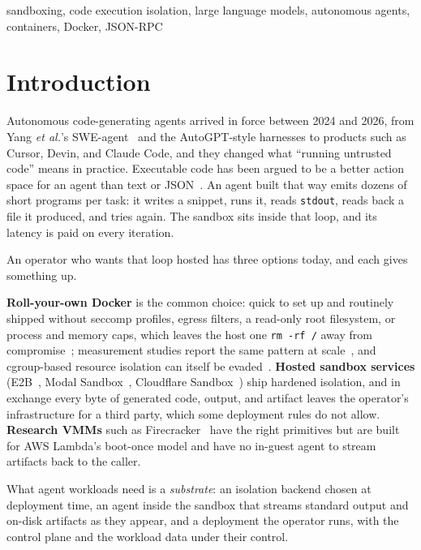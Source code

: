 \documentclass[conference]{IEEEtran}
\begin{document}
\begin{IEEEkeywords}
sandboxing, code execution isolation, large language models, autonomous
agents, containers, Docker, JSON-RPC
\end{IEEEkeywords}

\section{Introduction}\label{sec:intro}

Autonomous code-generating agents arrived in force between 2024 and 2026,
from Yang \emph{et al.}'s SWE-agent~\cite{sweagent} and the AutoGPT-style
harnesses to products such as Cursor, Devin, and Claude Code, and they
changed what ``running untrusted code'' means in practice. Executable code
has been argued to be a better action space for an agent than text or
JSON~\cite{codeact}. An agent built that way emits dozens of short programs
per task: it writes a snippet, runs it, reads \texttt{stdout}, reads back a
file it produced, and tries again. The sandbox sits inside that loop, and its
latency is paid on every iteration.

An operator who wants that loop hosted has three options today, and each
gives something up.

\textbf{Roll-your-own Docker} is the common choice: quick to set up and
routinely shipped without seccomp profiles, egress filters, a read-only
root filesystem, or process and memory caps, which leaves the host one
\texttt{rm -rf /} away from compromise~\cite{runc-cve}; measurement
studies report the same pattern at scale~\cite{container-measure}, and
cgroup-based resource isolation can itself be
evaded~\cite{houdini-cgroups}. \textbf{Hosted sandbox services}
(E2B~\cite{e2b}, Modal Sandbox~\cite{modal}, Cloudflare
Sandbox~\cite{cfsandbox}) ship hardened isolation, and in exchange every
byte of generated code, output, and artifact leaves the operator's
infrastructure for a third party, which some deployment rules do not allow.
\textbf{Research VMMs} such as Firecracker~\cite{firecracker} have the
right primitives but are built for AWS Lambda's boot-once model and have no
in-guest agent to stream artifacts back to the caller.

What agent workloads need is a \emph{substrate}: an isolation backend chosen
at deployment time, an agent inside the sandbox that streams standard output
and on-disk artifacts as they appear, and a deployment the operator runs,
with the control plane and the workload data under their control.
\end{document}
